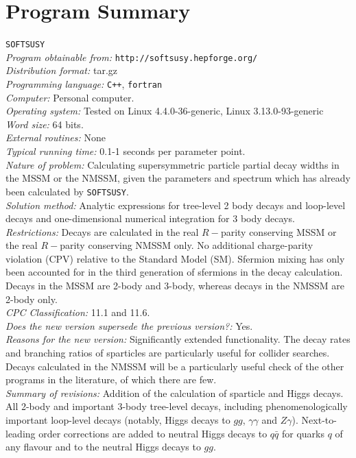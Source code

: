 \documentclass[final,3p,times,pdflatex]{elsarticle}
\def\SOFTSUSY{{\tt SOFTSUSY}}
\begin{document}
\section{Program Summary}
 \SOFTSUSY{} \\
{\em Program obtainable   from:} {\tt http://softsusy.hepforge.org/} \\
{\em Distribution format:}\/ tar.gz \\
{\em Programming language:} {\tt C++}, {\tt fortran} \\
{\em Computer:}\/ Personal computer. \\
{\em Operating system:}\/ Tested on Linux 4.4.0-36-generic, Linux 3.13.0-93-generic
\\
{\em Word size:}\/ 64 bits. \\
{\em External routines:}\/ None \\
{\em Typical running time:}\/ 0.1-1 seconds per parameter point. \\
{\em Nature of problem:}\/ Calculating supersymmetric particle partial decay
widths in the 
MSSM or the NMSSM\@, given the parameters and spectrum which has already been
calculated by \SOFTSUSY{}. \\
{\em Solution method:}\/ Analytic expressions for tree-level 2 body decays and loop-level decays and
one-dimensional numerical integration for 3 body decays.\\
{\em Restrictions:}\/ Decays are calculated in the real $R-$parity conserving
MSSM  or the real $R-$parity conserving
NMSSM only. No additional charge-parity violation (CPV) relative to the
Standard Model (SM). Sfermion mixing has only been accounted for in the third
generation of sfermions in the decay calculation. Decays in the MSSM are
2-body and 3-body, whereas decays in the NMSSM are 2-body only. \\
{\em CPC Classification:}\/ 11.1 and 11.6. \\
{\em Does the new version supersede the previous version?:}\/ Yes. \\
{\em Reasons for the new version:}\/ Significantly extended functionality. The
decay rates and branching ratios of sparticles are particularly useful for
collider searches. Decays calculated in the NMSSM will be a particularly
useful check of the other programs in the literature, of which there are few.\\
{\em Summary of revisions:}\/
Addition of the calculation of sparticle and Higgs decays. 
All 2-body and important 3-body tree-level
decays, including phenomenologically important loop-level decays (notably,
Higgs decays to $gg$, $\gamma \gamma$ and $Z \gamma$). Next-to-leading order corrections
are added to neutral Higgs  decays to $q \bar q$ for quarks $q$ of any flavour and to the neutral Higgs
decays to $gg$.
\end{document}
